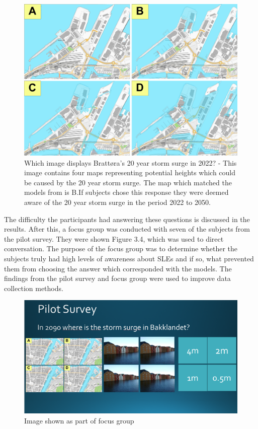 \begin{figure}[H]
    \centering
    \includegraphics[width=16cm]{fig/brattora question on 2022 20 yr storm surge quadrant.png}
    \caption{Which image displays Brattøra's 20 year storm surge in 2022? - This image contains four maps representing potential heights which could be caused by the 20 year storm surge. The map which matched the models from \cite{kartverket_se_2021} is B.If subjects chose this response they were deemed aware of the 20 year storm surge in the period 2022 to 2050.}
    \label{fig:brattora_2022_stormsurge}
\end{figure}

The difficulty the participants had answering these questions is discussed in the results. After this, a focus group was conducted with seven of the subjects from the pilot survey.  They were shown Figure 3.4, which was used to direct conversation. The purpose of the focus group was to determine whether the subjects truly had high levels of awareness about SLEs and if so, what prevented them from choosing the answer which corresponded with the models. The findings from the pilot survey and focus group were used to improve data collection methods. 

\begin{figure}[H]
    \centering
    \includegraphics[width=1\textwidth]{fig_results/slide-pilot-survey.png}
    \caption{Image shown as part of focus group}
    \label{fig:slide}
\end{figure}

